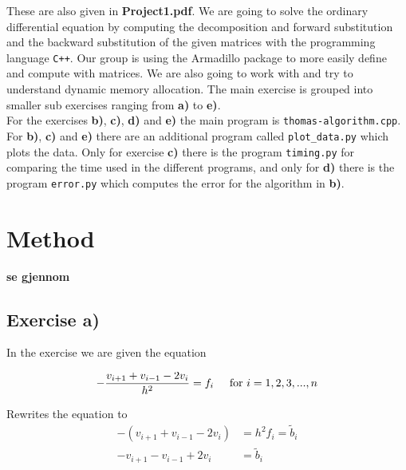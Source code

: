 \documentclass{article}
\begin{document}
These are also given in \textbf{Project1.pdf}. We are going to solve the ordinary differential equation by computing the decomposition and forward substitution and the backward substitution of the given matrices with the programming language \texttt{C++}. Our group is using the Armadillo package to more easily define and compute with matrices. We are also going to work with and try to understand dynamic memory allocation. The main exercise is grouped into smaller sub exercises ranging from \textbf{a)} to \textbf{e)}. \\

For the exercises \textbf{b)}, \textbf{c)}, \textbf{d)} and \textbf{e)} the main program is \texttt{thomas-algorithm.cpp}. For \textbf{b)}, \textbf{c)} and \textbf{e)} there are an additional program called \texttt{plot\_data.py} which plots the data. Only for exercise \textbf{c)} there is the program \texttt{timing.py} for comparing the time used in the different programs, and only for \textbf{d)} there is the program \texttt{error.py} which computes the error for the algorithm in \textbf{b)}. \\


\vspace{1cm}

\section{Method}

  {\large \bf se gjennom} \\

\subsection{Exercise a)}

  In the exercise we are given the equation

  \begin{equation*}
    - \frac{v_{i+1} + v_{i-1} - 2 v_i}{h^2} = f_i \hspace{5mm} \textrm{for} ~  i = 1, 2, 3, ... , n
  \end{equation*}

  Rewrites the equation to
  \begin{align*}
    - (v_{i+1} + v_{i-1} - 2 v_i) &= h^2 f_i = \tilde{b}_i \\
    - v_{i+1} - v_{i-1} + 2 v_i &= \tilde{b}_i
  \end{align*}
\end{document}
